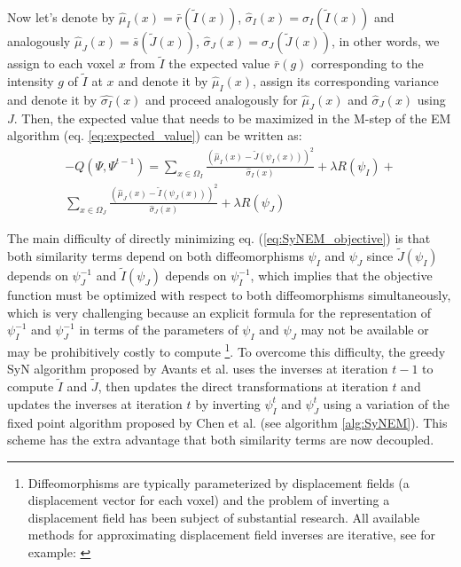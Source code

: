 \documentclass[11pt]{article}
\begin{document}
Now let's denote by $\hat{\mu}_{I}(x) = \bar{r}(\tilde{I}(x))$, $\hat{\sigma}_{I}(x) = \sigma_{I}(\tilde{I}(x))$ and analogously
$\hat{\mu}_{J}(x) = \bar{s}(\tilde{J}(x))$, $\hat{\sigma}_{J}(x) = \sigma_{J}(\tilde{J}(x))$, in other words, we assign to each voxel $x$ from
$\tilde{I}$ the expected value $\bar{r}(g)$ corresponding to the intensity $g$ of $\tilde{I}$ at $x$ and denote it by $\hat{\mu}_{I}(x)$, assign
its corresponding variance and denote it by $\hat{\sigma_{I}}(x)$ and proceed analogously for $\hat{\mu}_{J}(x)$ and $\hat{\sigma}_{J}(x)$ using $J$.
Then, the expected value that needs to be maximized in the M-step of the EM algorithm (eq. \ref{eq:expected_value}) can be written as:
\begin{align}\label{eq:SyNEM_objective}
    -Q(\Psi, \Psi^{t-1}) = \sum_{x \in \Omega_{I}} \frac{(\hat{\mu}_{I}(x) - \tilde{J}(\psi_{I}(x)))^{2}}{\hat{\sigma}_{I}(x)} + \lambda R(\psi_{I}) + \\
    \nonumber\sum_{x \in \Omega_{J}} \frac{(\hat{\mu}_{J}(x) - \tilde{I}(\psi_{J}(x)))^{2}}{\hat{\sigma}_{J}(x)} + \lambda R(\psi_{J})
\end{align}

The main difficulty of directly minimizing eq. (\ref{eq:SyNEM_objective}) is that both similarity terms depend on both diffeomorphisms
$\psi_{I}$ and $\psi_{J}$ since $\tilde{J}(\psi_{I})$ depends on $\psi_{J}^{-1}$ and $\tilde{I}(\psi_{J})$ depends on $\psi_{I}^{-1}$, which implies that the
objective function must be optimized with respect to both diffeomorphisms simultaneously, which is very challenging because an explicit formula for the representation
of $\psi_{I}^{-1}$ and $\psi_{J}^{-1}$ in terms of the parameters of $\psi_{I}$ and $\psi_{J}$ may not be available or may be prohibitively costly to compute
\footnote{Diffeomorphisms are typically parameterized by displacement fields (a displacement vector for each voxel) and the problem of inverting a displacement field
has been subject of substantial research. All available methods for approximating displacement field inverses are iterative, see for example:
\cite{Chen2008}\cite{Avants2009}\cite{Christensen2001}\cite{Crum2007}\cite{Yan2010}}. To overcome this difficulty, the greedy SyN algorithm proposed by Avants et al.
\cite{Avants2011} uses the inverses at iteration $t-1$ to compute $\tilde{I}$ and $\tilde{J}$, then updates the direct transformations at iteration $t$ and updates the
inverses at iteration $t$ by inverting $\psi_{I}^{t}$ and $\psi_{J}^{t}$ using a variation of the fixed point algorithm proposed by Chen et al.\cite{Chen2008} (see
algorithm \ref{alg:SyNEM}). This scheme has the extra advantage that both similarity terms are now decoupled.\\
\end{document}
